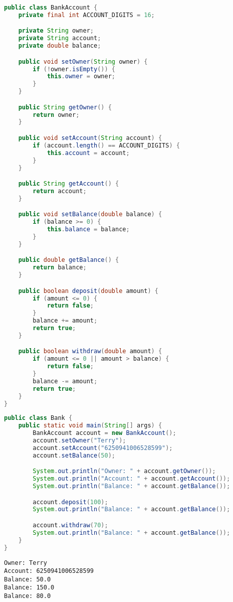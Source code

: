 \begin{lstlisting}[language=Java]
public class BankAccount {
    private final int ACCOUNT_DIGITS = 16;

    private String owner;
    private String account;
    private double balance;

    public void setOwner(String owner) {
        if (!owner.isEmpty()) {
            this.owner = owner;
        }
    }

    public String getOwner() {
        return owner;
    }

    public void setAccount(String account) {
        if (account.length() == ACCOUNT_DIGITS) {
            this.account = account;
        }
    }

    public String getAccount() {
        return account;
    }

    public void setBalance(double balance) {
        if (balance >= 0) {
            this.balance = balance;
        }
    }

    public double getBalance() {
        return balance;
    }

    public boolean deposit(double amount) {
        if (amount <= 0) {
            return false;
        }
        balance += amount;
        return true;
    }

    public boolean withdraw(double amount) {
        if (amount <= 0 || amount > balance) {
            return false;
        }
        balance -= amount;
        return true;
    }
}
\end{lstlisting}

\begin{lstlisting}[language=Java]
public class Bank {
    public static void main(String[] args) {
        BankAccount account = new BankAccount();
        account.setOwner("Terry");
        account.setAccount("6250941006528599");
        account.setBalance(50);

        System.out.println("Owner: " + account.getOwner());
        System.out.println("Account: " + account.getAccount());
        System.out.println("Balance: " + account.getBalance());

        account.deposit(100);
        System.out.println("Balance: " + account.getBalance());

        account.withdraw(70);
        System.out.println("Balance: " + account.getBalance());
    }
}
\end{lstlisting}

\begin{tcolorbox}
    \begin{verbatim}
Owner: Terry
Account: 6250941006528599
Balance: 50.0
Balance: 150.0
Balance: 80.0
\end{verbatim}
\end{tcolorbox}

